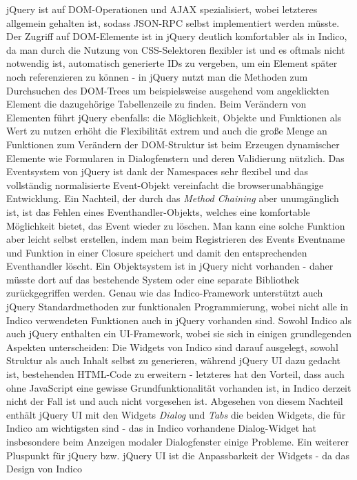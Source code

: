 jQuery ist auf DOM-Operationen und AJAX spezialisiert, wobei letzteres allgemein gehalten ist,
sodass JSON-RPC selbst implementiert werden müsste. Der Zugriff auf DOM-Elemente ist in jQuery
deutlich komfortabler als in Indico, da man durch die Nutzung von CSS-Selektoren flexibler ist und
es oftmals nicht notwendig ist, automatisch generierte IDs zu vergeben, um ein Element später noch
referenzieren zu können - in jQuery nutzt man die Methoden zum Durchsuchen des DOM-Trees um
beispielsweise ausgehend vom angeklickten Element die dazugehörige Tabellenzeile zu finden. Beim
Verändern von Elementen führt jQuery ebenfalls: die Möglichkeit, Objekte und Funktionen als Wert zu
nutzen erhöht die Flexibilität extrem und auch die große Menge an Funktionen zum Verändern der
DOM-Struktur ist beim Erzeugen dynamischer Elemente wie Formularen in Dialogfenstern und deren
Validierung nützlich. Das Eventsystem von jQuery ist dank der Namespaces sehr flexibel und das
vollständig normalisierte Event-Objekt vereinfacht die browserunabhängige Entwicklung. Ein Nachteil,
der durch das \emph{Method Chaining} aber unumgänglich ist, ist das Fehlen eines
Eventhandler-Objekts, welches eine komfortable Möglichkeit bietet, das Event wieder zu löschen. Man
kann eine solche Funktion aber leicht selbst erstellen, indem man beim Registrieren des Events
Eventname und Funktion in einer Closure speichert und damit den entsprechenden Eventhandler löscht.
Ein Objektsystem ist in jQuery nicht vorhanden - daher müsste dort auf das bestehende System oder
eine separate Bibliothek zurückgegriffen werden. Genau wie das Indico-Framework unterstützt auch
jQuery Standardmethoden zur funktionalen Programmierung, wobei nicht alle in Indico verwendeten
Funktionen auch in jQuery vorhanden sind. Sowohl Indico als auch jQuery enthalten ein UI-Framework,
wobei sie sich in einigen grundlegenden Aspekten unterscheiden: Die Widgets von Indico sind darauf
ausgelegt, sowohl Struktur als auch Inhalt selbst zu generieren, während jQuery UI dazu gedacht ist,
bestehenden HTML-Code zu erweitern - letzteres hat den Vorteil, dass auch ohne JavaScript eine
gewisse Grundfunktionalität vorhanden ist, in Indico derzeit nicht der Fall ist und auch nicht
vorgesehen ist. Abgesehen von diesem Nachteil enthält jQuery UI mit den Widgets \emph{Dialog} und
\emph{Tabs} die beiden Widgets, die für Indico am wichtigsten sind - das in Indico vorhandene
Dialog-Widget hat insbesondere beim Anzeigen modaler Dialogfenster einige Probleme. Ein weiterer
Pluspunkt für jQuery bzw. jQuery UI ist die Anpassbarkeit der Widgets - da das Design von Indico
